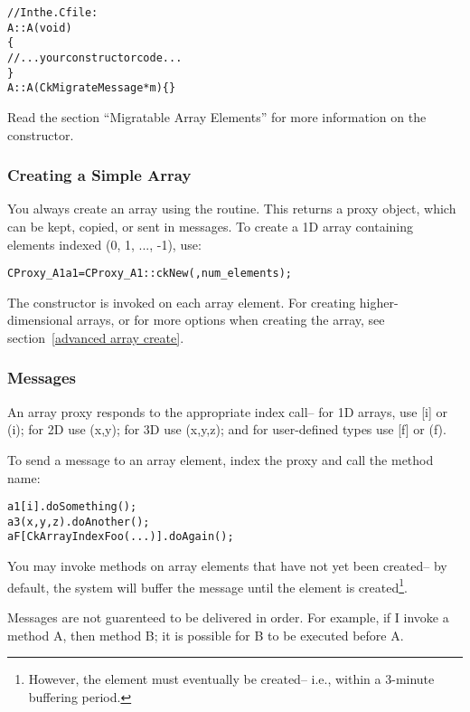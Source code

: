 \begin{alltt}
//In the .C file:
A::A(void)
\{
  //...your constructor code...
\}
A::A(CkMigrateMessage *m) \{ \}
\end{alltt}

Read the section ``Migratable Array Elements'' for more
information on the  constructor. 


\subsubsection{Creating a Simple Array}
\label{basic array creation}

You always create an array using the 
routine.  This returns a proxy object, which can
be kept, copied, or sent in messages.
To create a 1D array containing elements indexed 
(0, 1, ..., -1), use:

\begin{alltt}
CProxy_A1 a1 = CProxy_A1::ckNew(,num_elements);
\end{alltt}

The constructor is invoked on each array element.
For creating higher-dimensional arrays, or for more options
when creating the array, see section~\ref{advanced array create}.


\subsubsection{Messages}

An array proxy responds to the appropriate index call--
for 1D arrays, use [i] or (i); for 2D use (x,y); for 3D
use (x,y,z); and for user-defined types use [f] or (f).

To send a  message to an array element, index the proxy 
and call the method name:

\begin{alltt}
a1[i].doSomething();
a3(x,y,z).doAnother();
aF[CkArrayIndexFoo(...)].doAgain();
\end{alltt}

You may invoke methods on array elements that have not yet
been created-- by default, the system will buffer the message until the
element is created\footnote{However, the element must eventually be 
created-- i.e., within a 3-minute buffering period.}.

Messages are not guarenteed to be delivered in order.
For example, if I invoke a method A, then method B;
it is possible for B to be executed before A.

